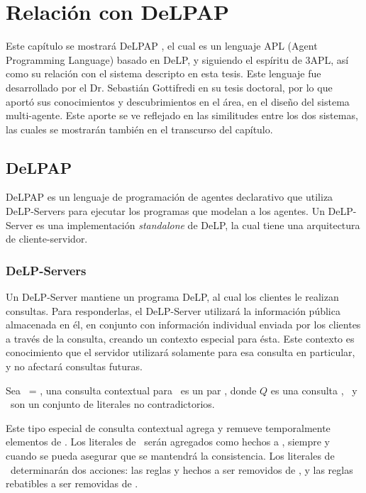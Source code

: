 
\chapter{Relación con DeLPAP}

\label{sec:delpap}

Este capítulo se mostrará DeLPAP \cite{Gottifredi:2010:QAA:1948131.1948169}, 
el cual es un lenguaje APL (Agent Programming 
Language) basado en DeLP, y siguiendo el espíritu de 3APL,
así como su relación con el sistema descripto en esta tesis. Este lenguaje fue
desarrollado por el Dr. Sebastián Gottifredi en su tesis doctoral, por lo que 
aportó sus conocimientos y descubrimientos en el área, en el diseño del sistema
multi-agente. Este aporte se ve reflejado en las similitudes entre los dos 
sistemas, las cuales se mostrarán también en el transcurso del capítulo.

\section{DeLPAP}

DeLPAP es un lenguaje de programación de agentes declarativo que utiliza 
DeLP-Servers para ejecutar los programas que modelan a los agentes. Un 
DeLP-Server es una implementación \textit{standalone} de DeLP, la cual 
tiene una arquitectura de cliente-servidor. 

\subsection{DeLP-Servers}
Un DeLP-Server mantiene un programa DeLP, al cual los clientes le realizan consultas. 
Para responderlas, el DeLP-Server utilizará la información pública almacenada 
en él, en conjunto con información individual enviada por los clientes a 
través de la consulta, creando un contexto especial para ésta. Este contexto 
es conocimiento que el servidor utilizará solamente para esa consulta en particular, y no afectará consultas futuras.

\begin{definicion}
Sea \PP\ = \SD, una consulta contextual para \PP\ es un par 
, donde $Q$ es una consulta \DLP, \addset\ y 
\remset\ son un conjunto de literales no contradictorios.
\end{definicion}

Este tipo especial de consulta contextual agrega y remueve temporalmente
elementos de \PP. Los literales de \addset\ serán agregados como hechos a 
\SSet, siempre y cuando se pueda asegurar que se mantendrá la consistencia.
Los literales de \remset\ determinarán dos acciones: las reglas y hechos a ser 
removidos de \SSet, y las reglas rebatibles a ser removidas de \DD.

